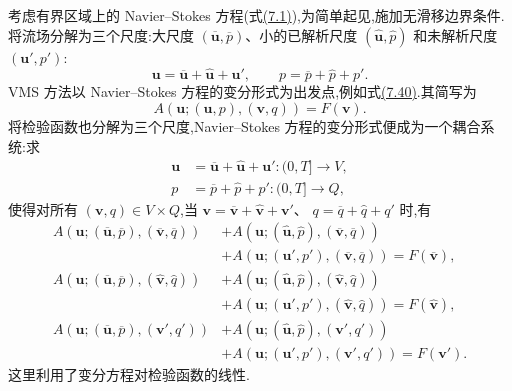 \begin{note}
\label{note:vms-three-scale-approach}
考虑有界区域上的 Navier--Stokes 方程(式\hyperref[eq:time-dependent-ns-strong]{(7.1)}),为简单起见,施加无滑移边界条件.将流场分解为三个尺度:大尺度 $(\overline{\bm{u}},\overline p)$、小的已解析尺度 $(\widehat{\bm{u}},\widehat p)$ 和未解析尺度 $(\bm{u}',p')$:
\[
 \bm{u}=\overline{\bm{u}}+\widehat{\bm{u}}+\bm{u}',\qquad
 p=\overline p+\widehat p+p'.
\]
VMS 方法以 Navier--Stokes 方程的变分形式为出发点,例如式\hyperref[eq:time-dependent-fem-velocity-error]{(7.40)}.其简写为
\begin{equation}\label{eq:variational-navier-stokes-weak-form}
 A(\bm{u};(\bm{u},p),(\bm{v},q))=F(\bm{v}).
\end{equation}
将检验函数也分解为三个尺度,Navier--Stokes 方程的变分形式便成为一个耦合系统:求
\[
\begin{aligned}
 \bm{u}&=\overline{\bm{u}}+\widehat{\bm{u}}+\bm{u}':(0,T]\to V,\\
 p&=\overline p+\widehat p+p':(0,T]\to Q,
\end{aligned}
\]
使得对所有 $(\bm{v},q)\in V\times Q$,当
$\bm{v}=\overline{\bm{v}}+\widehat{\bm{v}}+\bm{v}'$、
$q=\overline q+\widehat q+q'$ 时,有
\[
\begin{aligned}
 A(\bm{u};(\overline{\bm{u}},\overline p),
              (\overline{\bm{v}},\overline q))
 &+A(\bm{u};(\widehat{\bm{u}},\widehat p),
              (\overline{\bm{v}},\overline q))\\
 &+A(\bm{u};(\bm{u}',p'),
              (\overline{\bm{v}},\overline q))
 =F(\overline{\bm{v}}),\\
 A(\bm{u};(\overline{\bm{u}},\overline p),
              (\widehat{\bm{v}},\widehat q))
 &+A(\bm{u};(\widehat{\bm{u}},\widehat p),
              (\widehat{\bm{v}},\widehat q))\\
 &+A(\bm{u};(\bm{u}',p'),
              (\widehat{\bm{v}},\widehat q))
 =F(\widehat{\bm{v}}),\\
 A(\bm{u};(\overline{\bm{u}},\overline p),
              (\bm{v}',q'))
 &+A(\bm{u};(\widehat{\bm{u}},\widehat p),
              (\bm{v}',q'))\\
 &+A(\bm{u};(\bm{u}',p'),(\bm{v}',q'))
 =F(\bm{v}').
\end{aligned}
\]
这里利用了变分方程对检验函数的线性.


\end{note}
